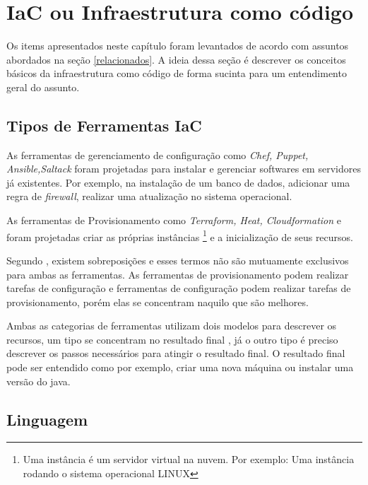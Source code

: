 \section{\esp IaC ou Infraestrutura como código} \label{IaC}

Os items apresentados neste capítulo foram levantados de acordo com assuntos abordados na seção \ref{relacionados}. A ideia dessa seção é descrever os conceitos básicos da infraestrutura como código de forma sucinta para um entendimento geral do assunto.  

\subsection{Tipos de Ferramentas IaC}
As ferramentas de gerenciamento de configuração como \textit{Chef, Puppet, Ansible,Saltack} foram projetadas para instalar e gerenciar softwares em servidores já existentes. Por exemplo, na instalação de um banco de dados, adicionar uma regra de \textit{firewall}, realizar uma atualização no sistema operacional. 

As ferramentas de Provisionamento como \textit{Terraform, Heat, Cloudformation} e foram projetadas criar as próprias instâncias \footnote{Uma instância é um servidor virtual na nuvem. Por exemplo: Uma instância rodando o sistema operacional LINUX} e a inicialização de seus recursos. 

Segundo , existem sobreposições e esses termos não são mutuamente exclusivos para ambas as ferramentas. As ferramentas de provisionamento podem realizar tarefas de configuração e ferramentas de configuração podem realizar tarefas de provisionamento, porém elas se concentram naquilo que são melhores. 

Ambas as categorias de ferramentas utilizam dois modelos para descrever os recursos, um tipo se concentram no resultado final , já o outro tipo é preciso descrever os passos necessários para atingir o resultado final. O resultado final pode ser entendido como por exemplo, criar uma nova máquina ou instalar uma versão do java. 

\subsection{Linguagem}

